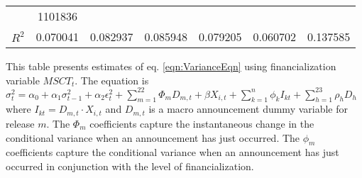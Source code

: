 \begin{sidewaystable}
{\begin{tabular}{@{}lllllllllllll@{}}
                 & \multicolumn{2}{c}{ 1101836 }                                                 \\ \textbf{$R^2$}             &\multicolumn{2}{c}{ 0.070041 }                                                 & \multicolumn{2}{c}{ 0.082937 }                                                 & \multicolumn{2}{c}{ 0.085948 }                                                 & \multicolumn{2}{c}{ 0.079205 }                                                 & \multicolumn{2}{c}{ 0.060702 }                                                   & \multicolumn{2}{c}{ 0.137585 }                                                 \\ \bottomrule 
\end{tabular}
}
\begin{tablenotes}\item 
        \singlespacing
        \footnotesize
        This table presents estimates of eq. \ref{eqn:VarianceEqn} using financialization variable $MSCT_t$. The equation is $\sigma_{t}^2=\alpha_0+\alpha_1 \sigma_{t-1}^2+\alpha_2 \epsilon_t^2 +\sum_{m=1}^{22} \Phi_m D_{m,t}+\beta X_{i,t}+\sum_{k=1}^n \phi_k I_{kt} + \sum_{h=1}^{23} \rho_h D_h$ where $I_{kt}=D_{m,t} \cdot X_{i,t}$ and $D_{m,t}$ is a macro announcement dummy variable for release $m$. The $\Phi_m$ coefficients capture the instantaneous change in the conditional variance when an announcement has just occurred. The $\phi_m$ coefficients capture the conditional variance when an announcement has just occurred in conjunction with the level of financialization.
\end{tablenotes}
\end{sidewaystable}


